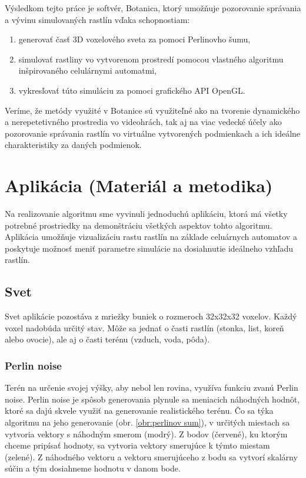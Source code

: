 \documentclass[12pt]{article}
\begin{document}
Výsledkom tejto práce je softvér, Botanica, ktorý umožňuje pozorovanie
správania a vývinu simulovaných rastlín vďaka schopnostiam:

\begin{enumerate}
	\item generovať časť 3D voxelového sveta za pomoci Perlinovho šumu,
	\item simulovať rastliny vo vytvorenom prostredí pomocou vlastného
	      algoritmu inšpirovaného celulárnymi automatmi,
	\item vykresľovať túto simuláciu za pomoci grafického API OpenGL.
\end{enumerate}

Veríme, že metódy využité v Botanice sú využiteľné ako na tvorenie dynamického
a nerepetetivného prostredia vo videohrách, tak aj na viac vedecké účely
ako pozorovanie správania rastlín vo virtuálne vytvorených podmienkach
a ich ideálne charakteristiky za daných podmienok.


\section{Aplikácia (Materiál a metodika)}

Na realizovanie algoritmu sme vyvinuli jednoduchú aplikáciu, ktorá má
všetky potrebné prostriedky na demonštráciu všetkých aspektov tohto algoritmu.
Aplikácia umožňuje vizualizáciu rastu rastlín na základe celuárnych automatov
a poskytuje možnosť meniť parametre simulácie na dosiahnutie ideálneho vzhľadu
rastlín.

\subsection{Svet} \label{subsec:svet}

Svet aplikácie pozostáva z mriežky buniek o rozmeroch 32x32x32 voxelov.
Každý voxel nadobúda určitý stav. Môže sa jednať o časti rastlín (stonka, list,
koreň alebo ovocie), ale aj o časti terénu (vzduch, voda, pôda).

\subsubsection{Perlin noise}

Terén na určenie svojej výšky, aby nebol len rovina, využíva funkciu zvanú
Perlin noise. Perlin noise je spôsob generovania plynule sa meniacich náhodných
hodnôt, ktoré sa dajú skvele využiť na generovanie realistického terénu.
Čo sa týka algoritmu na jeho generovanie (obr. \ref{obr:perlinov sum}),
v určitých miestach sa vytvoria
vektory s náhodným smerom (modrý). Z bodov (červené), ku ktorým chceme pripísať
hodnoty, sa vytvoria vektory smerujúce k týmto miestam (zelené). Z náhodného
vektoru a vektoru smerujúceho z bodu sa vytvorí skalárny súčin a tým dosiahneme
hodnotu v danom bode.
\end{document}
